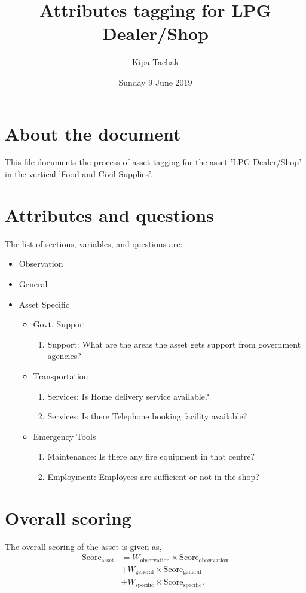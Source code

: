 \documentclass[oneside,twocolumn]{article}
\title{Attributes tagging for LPG Dealer/Shop}
\author{Kipa Tachak}
\date{Sunday  9 June 2019}
\newcommand{\tsub}[2]{\text{#1}_{\text{#2}}}
\newcommand{\tsubb}[2]{#1_{\text{#2}}}
\begin{document}
\maketitle

\section{About the document}
This file documents the process of asset tagging for the asset 'LPG Dealer/Shop' in the
vertical 'Food and Civil Supplies'.

\section{Attributes and questions}
The list of sections, variables, and questions are:
    \begin{itemize}
    \item Observation
    \item General
    \item Asset Specific
    \begin{itemize}
\item Govt. Support
\begin{enumerate}
\item Support: What are the areas the asset gets support from government agencies?
\end{enumerate}

\item Transportation
\begin{enumerate}
\item Services: Is Home delivery service available?
\item Services: Is there Telephone booking facility available?
\end{enumerate}

\item Emergency Tools
\begin{enumerate}
\item Maintenance: Is there any fire equipment in that centre?
\item Employment: Employees are sufficient or not in the shop?
\end{enumerate}

\end{itemize}

    \end{itemize}
\section{Overall scoring}
The overall scoring of the asset is given as,
\begin{align*}
	\tsub{Score}{asset} &= \tsubb{W}{observation} \times \tsub{Score}{observation} \\
	&+ \tsubb{W}{general} \times \tsub{Score}{general} \\
	&+ \tsubb{W}{specific} \times \tsub{Score}{specific}.
\end{align*}
\end{document}
